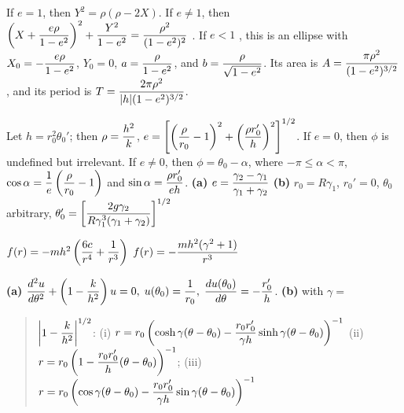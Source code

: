\medskip

 If $e=1$, then
 $Y^{2}=\rho(\rho-2X)$. If $e\ne1$, then $\displaystyle{\left(X+\frac{e\rho}{1-e^{2}}\right)^{2}}+\displaystyle\frac{Y^{2}}{1-e^{2}}=
\displaystyle\frac{\rho^{2}}{(1-e^{2})^{2}}$   . If
$e<1$ , this is an ellipse with
$X_{0}=-\displaystyle\frac{e\rho}{1-e^{2}}$,
$Y_{0}=0$, $a=\displaystyle\frac{\rho}{1-e^{2}}$,  and $b=\displaystyle\frac{\rho}{\sqrt{1-e^{2}}}$.
Its area is $\displaystyle{A=\frac{\pi\rho^{2}}{(1-e^{2})^{3/2}}}$, and its period is $\displaystyle{T=\frac{2\pi\rho^{2}}{|h|(1-e^{2})^{3/2}}}$.

Let $h=r_{0}^{2}\theta_{0}'$; then $\rho=\displaystyle\frac{h^{2}}{k}$,\;
$e=\displaystyle{\left[\left(\frac{\rho}{r_{0}}-1\right)^{2}+\left(\frac{\rho r_{0}'}{h}\right)^{2}\right]^{1/2}}$. If $e=0$, then
$\phi$ is undefined but irrelevant. If $e\ne0$, then $\phi=\theta_{0}-\alpha$, where
$-\pi\le\alpha<\pi$, $\cos\alpha=\displaystyle{\frac{1}{e}\left(\frac{\rho}{r_{0}}-1\right)}$ and $\sin\alpha=\displaystyle\frac{\rho r_{0}'}{eh}$.
{\bf (a)} $e=\displaystyle\frac{\gamma_{2}-\gamma_{1}}{\gamma_{1}+\gamma_{2}}$
{\bf (b)} $r_{0}=R\gamma_{1}$,\; $r_{0}'=0$,\; $\theta_{0}$ arbitrary,\;
$\theta_{0}'=\displaystyle{\left[\frac{2g\gamma_{2}}{R\gamma_{1}^{3}(\gamma_{1}+\gamma_{2})}\right]^{1/2}}$

 $f(r)=-mh^{2}\displaystyle\left(\frac{6c}{r^{4}}+\frac{1}{r^{3}}\right)$
$f(r)=-\displaystyle\frac{mh^{2}(\gamma^{2}+1)}{r^{3}}$

{\bf (a)} $\displaystyle\frac{d^{2}u}{d\theta^{2}}+\left(1-\frac{k}{h^{2}}\right)u=0,\;
u(\theta_{0})=\displaystyle\frac{1}{r_{0}},\;\displaystyle\frac{du(\theta_{0})}{d\theta}=-\displaystyle\frac{r_{0}'}{h}$.
{\bf (b)} with $\gamma=$
\vspace*{-.07in} \begin{quote}
$\left|1-\displaystyle\frac{k}{h^{2}}\right|^{1/2}$: (i)
$r=r_{0}\left(\cosh\gamma(\theta-\theta_{0})-\displaystyle\frac{r_{0}r_{0}'}{\gamma
h}\sinh\gamma(\theta-\theta_{0})\right)^{-1}$   (ii) $r=r_{0}\left(1
-\displaystyle\frac{r_{0}r_{0}'}{h}(\theta-\theta_{0})\right)^{-1}$;   (iii)
$r=r_{0}\left(\cos\gamma(\theta-\theta_{0})-\displaystyle\frac{r_{0}r_{0}'}{\gamma
h}\sin\gamma(\theta-\theta_{0})\right)^{-1}$
\end{quote}


